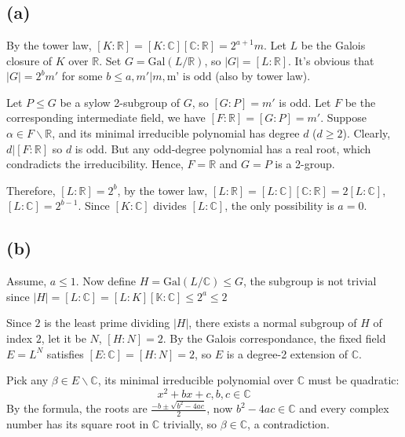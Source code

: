 \documentclass{article}
\title{\mytitle}
\author{\textbf{\myauthor}}
\date{}
\begin{document}
\maketitle

\section{}
\subsection*{(a)}
By the tower law, $[K:\mathbb{R}]=[K:\mathbb{C}][\mathbb{C}:\mathbb{R}]=2^{a+1}m$. Let $L$ be the Galois closure of $K$ over $\mathbb{R}$. Set $G=\mathrm{Gal}(L/\mathbb{R})$, so $|G|=[L:\mathbb{R}]$. It's obvious that $|G|=2^bm'$ for some $b\le a, m'|m, \text{m' is odd}$ (also by tower law).

Let $P\le G$ be a sylow 2-subgroup of $G$, so $[G:P]=m'$ is odd. Let $F$ be the corresponding intermediate field, we have $[F:\mathbb{R}]=[G:P]=m'$. Suppose $\alpha\in F\backslash \mathbb{R}$, and its minimal irreducible polynomial has degree $d$ ($d\ge 2$). Clearly, $d|[F:\mathbb{R}]$ so $d$ is odd. But any odd-degree polynomial has a real root, which condradicts the irreducibility. Hence, $F=\mathbb{R}$ and $G=P$ is a 2-group.

Therefore, $[L:\mathbb{R}]=2^b$, by the tower law, $[L:\mathbb{R}]=[L:\mathbb{C}][\mathbb{C}:\mathbb{R}]=2[L:\mathbb{C}]$, $[L:\mathbb{C}]=2^{b-1}$. Since $[K:\mathbb{C}]$ divides $[L:\mathbb{C}]$, the only possibility is $a=0$.
\subsection*{(b)}
Assume, $a\le 1$.
Now define $H=\mathrm{Gal}(L/\mathbb{C})\le G$, the subgroup is not trivial since $|H|=[L:\mathbb{C}]=[L:K][\mathbb{K}:\mathbb{C}]\le 2^a\le 2$

Since $2$ is the least prime dividing $|H|$, there exists a normal subgroup of $H$ of index $2$, let it be $N$, $[H:N]=2$. By the Galois correspondance, the fixed field $E=L^N$ satisfies $[E:\mathbb{C}]=[H:N]=2$, so $E$ is a degree-2 extension of $\mathbb{C}$.

Pick any $\beta\in E\backslash \mathbb{C}$, its minimal irreducible polynomial over $\mathbb{C}$ must be quadratic:
\[x^2+bx+c, b,c\in \mathbb{C}\]
By the formula, the roots are $\frac{-b\pm \sqrt{b^2-4ac}}{2}$, now $b^2-4ac\in \mathbb{C}$ and every complex number has its square root in $\mathbb{C}$ trivially, so $\beta\in \mathbb{C}$, a contradiction. 
\end{document}
